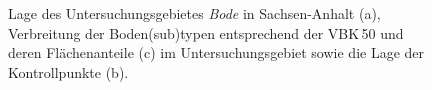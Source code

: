 \begin{figure}[p]
\centering{}
\centering{}
\caption[Lage des Untersuchungsgebietes \textit{Bode} in Sachsen-Anhalt, Verbreitung der Boden(sub)typen entsprechend der VBK\,50 und deren Flächenanteile im Untersuchungsgebiet sowie die Lage der Kontrollpunkte.]{Lage des Untersuchungsgebietes \textit{Bode} in Sachsen-Anhalt (a), Verbreitung der Boden(sub)typen entsprechend der VBK\,50 \citep[b; ][]{Hartmann2014} und deren Flächenanteile (c) im Untersuchungsgebiet sowie die Lage der Kontrollpunkte (b).}\label{fig:ug}
\end{figure}


